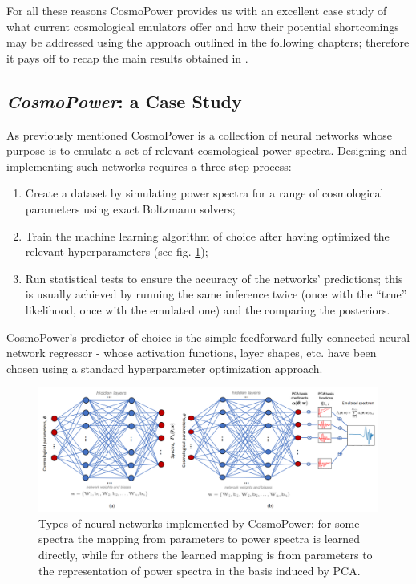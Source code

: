 For all these reasons CosmoPower provides us with an excellent case study of what current cosmological emulators offer and how their potential shortcomings may be addressed using the approach outlined in the following chapters; therefore it pays off to recap the main results obtained in \cite{cosmopower}.

\subsection{\textit{CosmoPower}: a Case Study}
As previously mentioned CosmoPower is a collection of neural networks whose purpose is to emulate a set of relevant cosmological power spectra. Designing and implementing such networks requires a three-step process:
\begin{enumerate}
    \item Create a dataset by simulating power spectra for a range of cosmological parameters using exact Boltzmann solvers;
    \item Train the machine learning algorithm of choice after having optimized the relevant hyperparameters (see fig. \ref{fig:cosmopower_reti});
    \item Run statistical tests to ensure the accuracy of the networks' predictions; this is usually achieved by running the same inference twice (once with the ``true'' likelihood, once with the emulated one) and the comparing the posteriors.
\end{enumerate}
CosmoPower's predictor of choice is the simple feedforward fully-connected neural network regressor - whose activation functions, layer shapes, etc. have been chosen using a standard hyperparameter optimization approach.
\begin{figure}%
    \centering
    \includegraphics[width=1.0\textwidth]{img/cosmopower_reti.png}
    \caption{Types of neural networks implemented by CosmoPower: for some spectra the mapping from parameters to power spectra is learned directly, while for others the learned mapping is from parameters to the representation of power spectra in the basis induced by PCA.}
    \label{fig:cosmopower_reti}
\end{figure}
